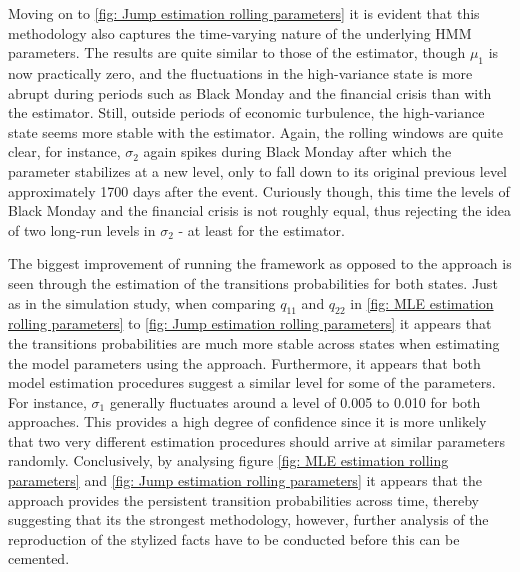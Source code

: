 Moving on to \cref{fig: Jump estimation rolling parameters} it is evident that this methodology also captures the time-varying nature of the underlying HMM parameters. The results are quite similar to those of the \mle estimator, though $\mu_1$ is now practically zero, and the fluctuations in the high-variance state is more abrupt during periods such as Black Monday and the financial crisis than with the \mle estimator. Still, outside periods of economic turbulence, the high-variance state seems more stable with the \jump estimator. Again, the rolling windows are quite clear, for instance, $\sigma_2$ again spikes during Black Monday after which the parameter stabilizes at a new level, only to fall down to its original previous level approximately 1700 days after the event. Curiously though, this time the levels of Black Monday and the financial crisis is not roughly equal, thus rejecting the idea of two long-run levels in $\sigma_2$ - at least for the \jump estimator. 

The biggest improvement of running the \jump framework as opposed to the \mle approach is seen through the estimation of the transitions probabilities for both states. Just as in the simulation study, when comparing $q_{11}$ and $q_{22}$ in \cref{fig: MLE estimation rolling parameters} to \cref{fig: Jump estimation rolling parameters} it appears that the transitions probabilities are much more stable across states when estimating the model parameters using the \jump approach. Furthermore, it appears that both model estimation procedures suggest a similar level for some of the parameters. For instance, $\sigma_1$ generally fluctuates around a level of 0.005 to 0.010 for both approaches. This provides a high degree of confidence since it is more unlikely that two very different estimation procedures should arrive at similar parameters randomly. Conclusively, by analysing figure \ref{fig: MLE estimation rolling parameters} and \ref{fig: Jump estimation rolling parameters} it appears that the \jump approach provides the persistent transition probabilities across time, thereby suggesting that its the strongest methodology, however, further analysis of the reproduction of the stylized facts have to be conducted before this can be cemented.


